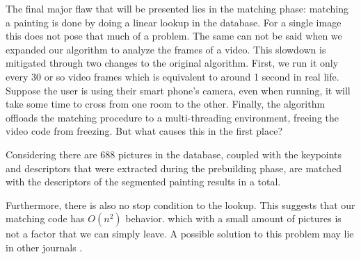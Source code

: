 	
	The final major flaw that will be presented lies in the matching phase: matching a painting is done by doing a linear lookup in the database. For a single image this does not pose that much of a problem. The same can not be said when we expanded our algorithm to analyze the frames of a video. This slowdown is mitigated through two changes to the original algorithm. First, we run it only every 30 or so video frames which is equivalent to around 1 second in real life. Suppose the user is using their smart phone's camera, even when running, it will take some time to cross from one room to the other. Finally, the algorithm offloads the matching procedure to a multi-threading environment, freeing the video code from freezing. But what causes this in the first place? 
	
	
	Considering there are 688 pictures in the database, coupled with the keypoints and descriptors that were extracted during the prebuilding phase, are matched with the descriptors of the segmented painting results in a total.
	
	Furthermore, there is also no stop condition to the lookup.
	This suggests that our matching code has $O(n^{2})$ behavior.
	which with a small amount of pictures is not a factor that we can simply leave. A possible solution to this problem may lie in other journals . 